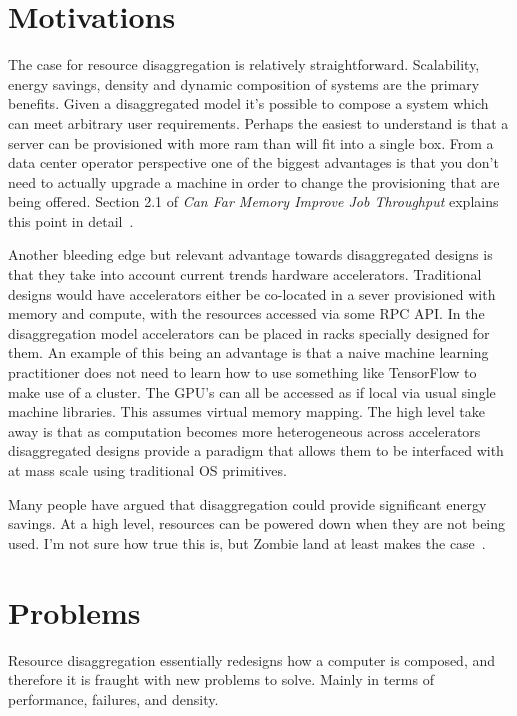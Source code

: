 \section{Motivations}


The case for resource disaggregation is relatively straightforward. Scalability,
energy savings, density and dynamic composition of systems are the primary
benefits. Given a disaggregated model it’s possible to compose a system which
can meet arbitrary user requirements. Perhaps the easiest to understand is that
a server can be provisioned with more ram than will fit into a single box. From
a data center operator perspective one of the biggest advantages is that you
don't need to actually upgrade a machine in order to change the provisioning
that are being offered. Section 2.1 of \textit{Can Far Memory Improve Job
Throughput} explains this point in detail~\cite{jobthroughput}. 

Another bleeding edge but relevant advantage towards disaggregated designs is
that they take into account current trends hardware accelerators. Traditional
designs would have accelerators either be co-located in a sever provisioned
with memory and compute, with the resources accessed via some RPC API. In the
disaggregation model accelerators can be placed in racks specially designed for
them. An example of this being an advantage is that a naive machine learning
practitioner does not need to learn how to use something like TensorFlow to make
use of a cluster. The GPU's can all be accessed as if local via usual single
machine libraries. This assumes virtual memory mapping. The high level take away
is that as computation becomes more heterogeneous across accelerators
disaggregated designs provide a paradigm that allows them to be interfaced with
at mass scale using traditional OS primitives.

Many people have argued that disaggregation could provide significant energy
savings. At a high level, resources can be powered down when they are not being
used. I'm not sure how true this is, but Zombie land at least makes the
case~\cite{zombieland}.

\section{Problems}

Resource disaggregation essentially redesigns how a computer is composed, and
therefore it is fraught with new problems to solve. Mainly in terms of
performance, failures, and density.

